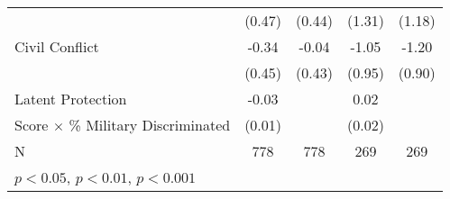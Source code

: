\begin{table}[htbp]
\begin{tabular}{l*{4}{c}}
                    &      (0.47)         &      (0.44)         &      (1.31)         &      (1.18)         \\
Civil Conflict      &       -0.34         &       -0.04         &       -1.05         &       -1.20         \\
                    &      (0.45)         &      (0.43)         &      (0.95)         &      (0.90)         \\
Latent Protection   &       -0.03\sym{**} &                     &        0.02         &                     \\
Score $\times$ \% Military Discriminated&      (0.01)         &                     &      (0.02)         &                     \\
\hline
N                   &         778         &         778         &         269         &         269         \\
\hline\hline
\multicolumn{5}{l}{\footnotesize \sym{*} \(p<0.05\), \sym{**} \(p<0.01\), \sym{***} \(p<0.001\)}\\
\end{tabular}
\end{table}
